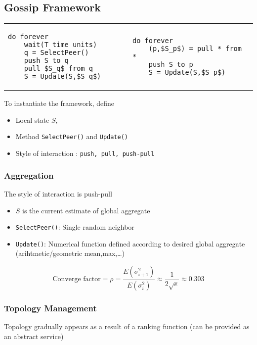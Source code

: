 \subsection{Gossip Framework}
\begin{tabular}{m{0.5\linewidth}m{0.5\linewidth}}
\begin{lstlisting}[caption={Active thread}, mathescape]
do forever
    wait(T time units)
    q = SelectPeer()
    push S to q
    pull $S_q$ from q
    S = Update(S,$S_q$)
\end{lstlisting}
&
\begin{lstlisting}[caption={Passive thread}, mathescape]
do forever
    (p,$S_p$) = pull * from *
    push S to p
    S = Update(S,$S_p$)
\end{lstlisting}
\end{tabular}

To instantiate the framework, define
\begin{itemize}
	\item Local state $S$,
	\item Method \texttt{SelectPeer()} and \texttt{Update()}
	\item Style of interaction : \texttt{push, pull, push-pull}
\end{itemize}

\subsubsection{Aggregation}
The style of interaction is push-pull
\begin{itemize}
	\item $S$ is the current estimate of global aggregate
	\item \texttt{SelectPeer()}: Single random neighbor
	\item \texttt{Update()}: Numerical function defined according to desired global
	aggregate (arihtmetic/geometric mean,max,\ldots)
\end{itemize}

$$ \textrm{Converge factor} = \rho = \frac{E(\sigma^2_{i+1})}{E(\sigma^2_i)} \approx \frac{1}{2 \sqrt{e}} \approx 0.303 $$


\subsubsection{Topology Management}

Topology gradually appears as a result of a ranking function (can be provided
as an abstract service)

